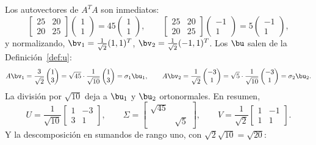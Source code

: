\begin{example}
Los autovectores de $A^TA$ son inmediatos:
\[
\begin{bmatrix}25&20\\ 20&25\end{bmatrix}\begin{pmatrix}1\\ 1\end{pmatrix}
=45\begin{pmatrix}1\\ 1\end{pmatrix},
\qquad
\begin{bmatrix}25&20\\ 20&25\end{bmatrix}\begin{pmatrix}-1\\ 1\end{pmatrix}
=5\begin{pmatrix}-1\\ 1\end{pmatrix},
\]
y normalizando,
$\bv_1=\frac1{\sqrt2}(1,1)^T$, $\bv_2=\frac1{\sqrt2}(-1,1)^T$.
Los $\bu$ salen de la Definición~\ref{def:u}:
\[
A\bv_1=\frac{3}{\sqrt2}\begin{pmatrix}1\\ 3\end{pmatrix}
=\sqrt{45}\cdot\frac1{\sqrt{10}}\begin{pmatrix}1\\ 3\end{pmatrix}
=\sigma_1\bu_1,
\qquad
A\bv_2=\frac1{\sqrt2}\begin{pmatrix}-3\\ 1\end{pmatrix}
=\sqrt{5}\cdot\frac1{\sqrt{10}}\begin{pmatrix}-3\\ 1\end{pmatrix}
=\sigma_2\bu_2 .
\]
La división por $\sqrt{10}$ deja a $\bu_1$ y $\bu_2$ ortonormales. En
resumen,
\[
U=\frac1{\sqrt{10}}\begin{bmatrix}1&-3\\ 3&1\end{bmatrix},
\qquad
\Sigma=\begin{bmatrix}\sqrt{45}&\\ &\sqrt5\end{bmatrix},
\qquad
V=\frac1{\sqrt2}\begin{bmatrix}1&-1\\ 1&1\end{bmatrix} .
\]
Y la descomposición en sumandos de rango uno, con
$\sqrt2\sqrt{10}=\sqrt{20}$:

\end{example}

